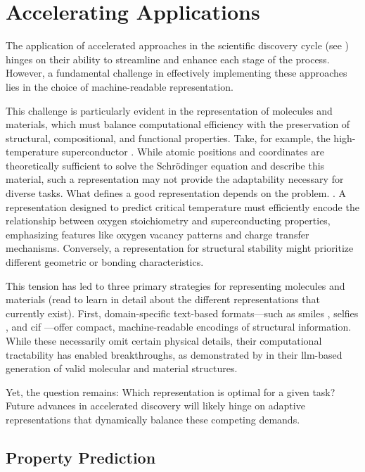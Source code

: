\section{Accelerating Applications}
The application of accelerated approaches in the scientific discovery cycle (see ) hinges on their ability to streamline and enhance each stage of the process.
However, a fundamental challenge in effectively implementing these approaches lies in the choice of machine-readable representation.

This challenge is particularly evident in the representation of molecules and materials, which must balance computational efficiency with the preservation of structural, compositional, and functional properties. 
Take, for example, the high-temperature superconductor . 
While atomic positions and coordinates are theoretically sufficient to solve the Schrödinger equation and describe this material, such a representation may not provide the adaptability necessary for diverse tasks. What defines a good representation depends on the problem. \autocite{huang2016understanding}. 
A representation designed to predict critical temperature must efficiently encode the relationship between oxygen stoichiometry and superconducting properties, emphasizing features like oxygen vacancy patterns and charge transfer mechanisms. 
Conversely, a representation for structural stability might prioritize different geometric or bonding characteristics.

This tension has led to three primary strategies for representing molecules and materials (read  to learn in detail about the different representations that currently exist). 
First, domain-specific text-based formats---such as \gls{smiles} \autocite{weininger1988smiles}, \gls{selfies} \autocite{krenn2020self}, and \gls{cif} \autocite{hall1991crystallographic}---offer compact, machine-readable encodings of structural information. While these necessarily omit certain physical details, their computational tractability has enabled breakthroughs, as demonstrated by \textcite{jablonka2024leveraging} in their \gls{llm}-based generation of valid molecular and material structures.

Yet, the question remains: Which representation is optimal for a given task? Future advances in accelerated discovery will likely hinge on adaptive representations that dynamically balance these competing demands.

\subsection{Property Prediction} \label{sec:prediction}

